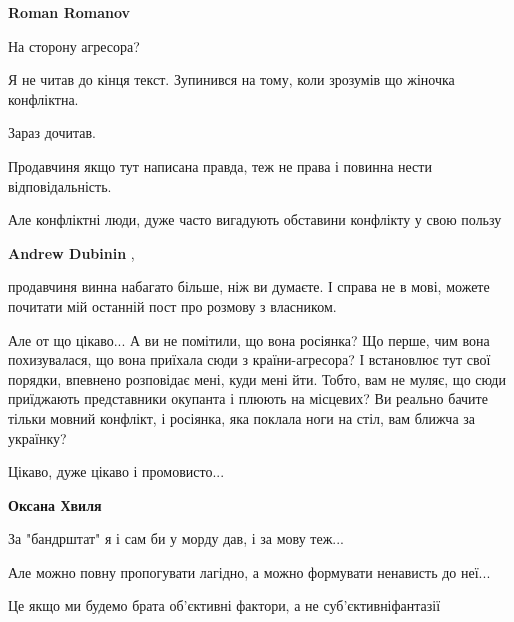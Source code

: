 \begin{itemize}
\begin{itemize}
\textbf{Roman Romanov} 

На сторону агресора?

Я не читав до кінця текст. Зупинився на тому, коли зрозумів що жіночка
конфліктна.

Зараз дочитав.

Продавчиня якщо тут написана правда, теж не права і повинна нести
відповідальність.

Але конфліктні люди, дуже часто вигадують обставини конфлікту у свою пользу

 
\textbf{Andrew Dubinin} , 

продавчиня винна набагато більше, ніж ви думаєте. І справа не в мові, можете
почитати мій останній пост про розмову з власником.

Але от що цікаво... А ви не помітили, що вона росіянка? Що перше, чим вона
похизувалася, що вона приїхала сюди з країни-агресора? І встановлює тут свої
порядки, впевнено розповідає мені, куди мені йти. Тобто, вам не муляє, що сюди
приїджають представники окупанта і плюють на місцевих? Ви реально бачите тільки
мовний конфлікт, і росіянка, яка поклала ноги на стіл, вам ближча за українку?

Цікаво, дуже цікаво і промовисто...

 
\textbf{Оксана Хвиля}

За "бандрштат" я і сам би у морду дав, і за мову теж...

Але можно повну пропогувати лагідно, а можно формувати ненависть до неї...

Це якщо ми будемо брата об'єктивні фактори, а не суб'єктивніфантазії

\end{itemize}

 


\end{itemize}

